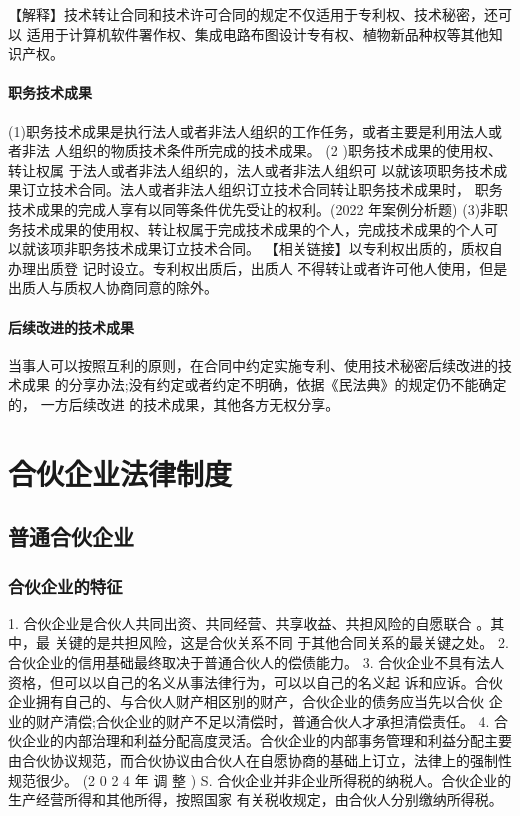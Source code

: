 \documentclass[UTF8,12pt]{ctexart}
\numberwithin{equation}{section} %
\numberwithin{figure}{section}
\numberwithin{table}{section}
\begin{document}
	【解释】技术转让合同和技术许可合同的规定不仅适用于专利权、技术秘密，还可以 适用于计算机软件署作权、集成电路布图设计专有权、植物新品种权等其他知识产权。
	
	\paragraph{职务技术成果} (1)职务技术成果是执行法人或者非法人组织的工作任务，或者主要是利用法人或者非法 人组织的物质技术条件所完成的技术成果。
	(2 )职务技术成果的使用权、转让权属 于法人或者非法人组织的，法人或者非法人组织可 以就该项职务技术成果订立技术合同。法人或者非法人组织订立技术合同转让职务技术成果时， 职务技术成果的完成人享有以同等条件优先受让的权利。(2022 年案例分析题) (3)非职务技术成果的使用权、转让权属于完成技术成果的个人，完成技术成果的个人可 以就该项非职务技术成果订立技术合同。
	【相关链接】以专利权出质的，质权自办理出质登 记时设立。专利权出质后，出质人 不得转让或者许可他人使用，但是出质人与质权人协商同意的除外。
	
	\paragraph{后续改进的技术成果} 当事人可以按照互利的原则，在合同中约定实施专利、使用技术秘密后续改进的技术成果 的分享办法;没有约定或者约定不明确，依据《民法典》的规定仍不能确定的， 一方后续改进 的技术成果，其他各方无权分享。

	
	\newpage
	\section{合伙企业法律制度}
	
	\subsection{普通合伙企业}
	\subsubsection{合伙企业的特征} 
	1. 合伙企业是合伙人共同出资、共同经营、共享收益、共担风险的自愿联合 。其中，最 关键的是共担风险，这是合伙关系不同 于其他合同关系的最关键之处。
	2. 合伙企业的信用基础最终取决于普通合伙人的偿债能力。
	3. 合伙企业不具有法人资格，但可以以自己的名义从事法律行为，可以以自己的名义起 诉和应诉。合伙企业拥有自己的、与合伙人财产相区别的财产，合伙企业的债务应当先以合伙 企业的财产清偿;合伙企业的财产不足以清偿时，普通合伙人才承担清偿责任。
	4. 合伙企业的内部治理和利益分配高度灵活。合伙企业的内部事务管理和利益分配主要 由合伙协议规范，而合伙协议由合伙人在自愿协商的基础上订立，法律上的强制性规范很少。 (2 0 2 4 年 调 整 )
	S. 合伙企业并非企业所得税的纳税人。合伙企业的生产经营所得和其他所得，按照国家 有关税收规定，由合伙人分别缴纳所得税。
	
\end{document}
